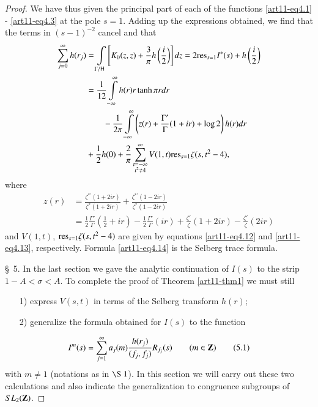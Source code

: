 \begin{proof}
We have thus given the principal part of each of the functions \eqref{art11-eq4.1}  - \eqref{art11-eq4.3} at the pole $s =1$. Adding up the expressions obtained, we find that the terms in $(s-1)^{-2}$ cancel and that 
\begin{align*}
\sum\limits^\infty_{j=0} h(r_j) & = \int\limits_{\Gamma / \mathsf{H}} \left[K_0 (z,z) + \frac{3}{\pi} h\left(\frac{i}{2} \right) \right] dz = 2 \mathrm{res}_{s=1} I^\ast (s) + h \left(\frac{i}{2} \right)\\
& =\frac{1}{12} \int\limits^\infty_{-\infty} h(r) r \tanh \pi r dr\\
& \qquad - \frac{1}{2 \pi } \int\limits^\infty_{-\infty} \left(z(r) + \frac{\Gamma'}{\Gamma} (1+ ir) + \log 2 \right) h (r) dr\\
& + \frac{1}{2} h(0) + \frac{2}{\pi} \sum\limits^\infty_{\substack{t = - \infty\\ t^2 \neq4}} V(1,t) \mathrm{res}_{s=1} \zeta (s, t^2 -4),
\end{align*}
where\pageoriginale
\begin{align*}
z(r) &= \frac{\zeta^{\ast'} (1+ 2 ir)}{\zeta^\ast (1+ 2 ir)} + \frac{\zeta^{\ast'} (1-2 ir)}{\zeta^{\ast} (1-2ir)}\\
& = \frac{1}{2} \frac{\Gamma'}{\Gamma} (\frac{1}{2} + ir) - \frac{1}{2} \frac{\Gamma'}{\Gamma} (ir) + \frac{\zeta'}{\zeta} (1+ 2 ir) - \frac{\zeta'}{\zeta} (2 ir)
\end{align*}
and  $V(1,t)$, $\mathrm{res}_{s=1} \zeta (s, t^2 -4)$ are given by equations \eqref{art11-eq4.12} and \eqref{art11-eq4.13}, respectively. Formula \eqref{art11-eq4.14} is the Selberg trace formula.

\S~5.  In the last section we gave the analytic continuation of $I(s)$ to the strip $1- A <\sigma <A$. To complete the proof of Theorem \ref{art11-thm1} we must still
\begin{itemize}
\item[1)] express $V(s,t)$ in terms of the Selberg transform $h(r)$;

\item[2)] generalize the formula obtained for $I(s)$ to the function 
\end{itemize}
\begin{equation*}
I^m (s) =\sum\limits^\infty_{j=1} a_j (m) \frac{h(r_j)}{(f_j, f_j)} R_{f_j} (s) \qquad (m \in \mathbf{Z}) \tag{5.1}\label{art11-eq5.1}
\end{equation*}
with $m \neq 1$ (notations as in $\S~1$). In this section we will carry out these two calculations and also indicate the generalization to congruence subgroups of $SL_2 (\mathbf{Z})$.


\end{proof}
